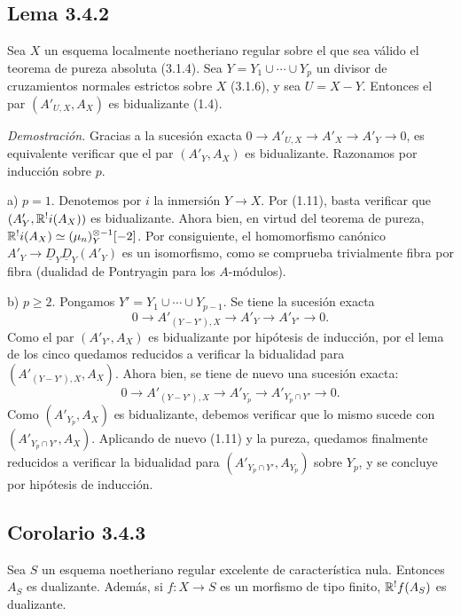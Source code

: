 \subsection*{Lema 3.4.2}
Sea $X$ un esquema localmente noetheriano regular sobre el que sea válido el teorema de pureza absoluta (3.1.4). Sea $Y = Y_1 \cup \cdots \cup Y_p$ un divisor de cruzamientos normales estrictos sobre $X$ (3.1.6), y sea $U = X - Y$. Entonces el par $(A'_{U,X}, A_X)$ es bidualizante (1.4).

\emph{Demostración.} Gracias a la sucesión exacta $0 \to A'_{U,X} \to A'_X \to A'_Y \to 0$, es equivalente verificar que el par $(A'_Y, A_X)$ es bidualizante. Razonamos por inducción sobre $p$.

a) $p = 1$. Denotemos por $i$ la inmersión $Y \to X$. Por (1.11), basta verificar que $(A'_Y, \mathbb{R}^{!}i(A_X))$ es bidualizante. Ahora bien, en virtud del teorema de pureza, $\mathbb{R}^{!}i(A_X) \simeq (\mu_n)^{\otimes -1}_Y[-2]$. Por consiguiente, el homomorfismo canónico $A'_Y \to \underline{D}_Y \underline{D}_Y(A'_Y)$ es un isomorfismo, como se comprueba trivialmente fibra por fibra (dualidad de Pontryagin para los $A$-módulos).

b) $p \geqslant 2$. Pongamos $Y' = Y_1 \cup \cdots \cup Y_{p-1}$. Se tiene la sucesión exacta
\[
0 \longrightarrow A'_{(Y-Y'),X} \longrightarrow A'_Y \longrightarrow A'_{Y'} \longrightarrow 0.
\]
Como el par $(A'_{Y'}, A_X)$ es bidualizante por hipótesis de inducción, por el lema de los cinco quedamos reducidos a verificar la bidualidad para $(A'_{(Y-Y'),X}, A_X)$. Ahora bien, se tiene de nuevo una sucesión exacta:
\[
0 \longrightarrow A'_{(Y-Y'),X} \longrightarrow A'_{Y_p} \longrightarrow A'_{Y_p \cap Y'} \longrightarrow 0.
\]
Como $(A'_{Y_p}, A_X)$ es bidualizante, debemos verificar que lo mismo sucede con $(A'_{Y_p \cap Y'}, A_X)$. Aplicando de nuevo (1.11) y la pureza, quedamos finalmente reducidos a verificar la bidualidad para $(A'_{Y_p \cap Y'}, A_{Y_p})$ sobre $Y_p$, y se concluye por hipótesis de inducción.

\subsection*{Corolario 3.4.3}
Sea $S$ un esquema noetheriano regular excelente de característica nula. Entonces $A_S$ es dualizante. Además, si $f : X \to S$ es un morfismo de tipo finito, $\mathbb{R}^{!}f(A_S)$ es dualizante.

